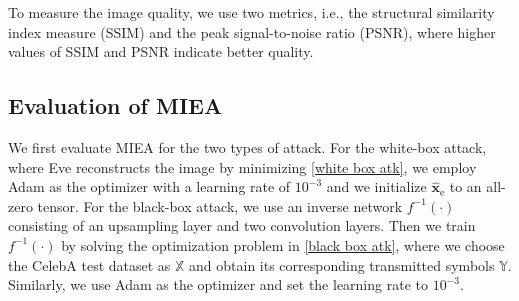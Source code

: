 \documentclass[conference]{IEEEtran}
\makeatletter
\newcommand{\tabincell}[2]{\begin{tabular}{@{}#1@{}}#2\end{tabular}}
\makeatother
\begin{document}
To measure the image quality, we use two metrics, i.e., the structural similarity index measure (SSIM) and the peak signal-to-noise ratio (PSNR)\cite{bourtsoulatze2019deep}, where higher values of SSIM and PSNR indicate better quality.


\subsection{Evaluation of MIEA}
\label{sec eval miea}
We first evaluate MIEA for the two types of attack. For the white-box attack, where Eve reconstructs the image by minimizing \eqref{white box atk}, we employ Adam\cite{kingma2014adam} as the optimizer with a learning rate of $10^{-3}$ and we initialize $\hat{\boldsymbol{x}}_\mathrm{e}$ to an all-zero tensor. For the black-box attack, we use an inverse network $f^{-1}(\cdot)$ consisting of an upsampling layer and two convolution layers. Then we train $f^{-1}(\cdot)$ by solving the optimization problem in \eqref{black box atk}, where we choose the CelebA test dataset as $\mathbb{X}$ and obtain its corresponding transmitted symbols $\mathbb{Y}$. Similarly, we use Adam as the optimizer and set the learning rate to $10^{-3}$.

    

\end{document}
